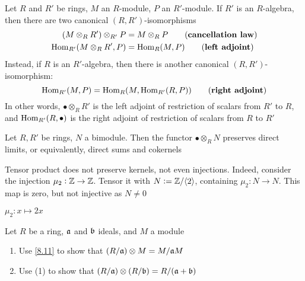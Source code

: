 \documentclass[11pt]{article}
\begin{document}
\begin{corollary}[]
Let \(R\) and \(R'\) be rings, \(M\) an \(R\)-module, \(P\) an \(R'\)-module.
If \(R'\) is an \(R\)-algebra, then there are two canonical
\((R,R')\)-isomorphisms
\begin{align*}
(M\otimes_RR')\otimes_{R'}P&=M\otimes_RP\tag*{(\textbf{cancellation law})}\\
\Hom_{R'}(M\otimes_RR',P)&=\Hom_R(M,P)\tag*{(\textbf{left adjoint})}
\end{align*}
Instead, if \(R\) is an \(R'\)-algebra, then there is another canonical
\((R,R')\)-isomorphism:
\begin{equation*}
\Hom_{R'}(M,P)=\Hom_{R}(M,\Hom_{R'}(R,P))\tag*{(\textbf{right adjoint})}
\end{equation*}
In other words, \(\bullet\otimes_RR'\) is the left adjoint of restriction of
scalars from \(R'\) to \(R\), and \(\operatorname{Hom}_{R'}(R,\bullet)\) is the right
adjoint of restriction of scalars from \(R\) to \(R'\)
\end{corollary}

\begin{corollary}[]
\label{8.11}
Let \(R,R'\) be rings, \(N\) a bimodule. Then the functor \(\bullet\otimes_R
   N\)
preserves direct limits, or equivalently, direct sums and cokernels
\end{corollary}

\begin{examplle}[]
Tensor product does not preserve kernels, not even injections. Indeed, consider
the injection \(\mu_2:\mathbb{Z}\to\mathbb{Z}\). Tensor it with \(N:=\mathbb{Z}/\langle2\rangle\), containing
\(\mu_2:N\to N\). This map is zero, but not injective as \(N\neq0\)

\(\mu_2:x\mapsto 2x\)
\end{examplle}

\begin{exercise}
\label{8.13}
Let \(R\) be a ring, \(\mathfrak{a}\) and \(\mathfrak{b}\) ideals, and \(M\) a module
\begin{enumerate}
\item Use \ref{8.11} to show that \((R/\mathfrak{a})\otimes M=M/\mathfrak{a} M\)
\item Use (1) to show that \((R/\mathfrak{a})\otimes(R/\mathfrak{b})=R/(\mathfrak{a}+\mathfrak{b})\)
\end{enumerate}
\end{exercise}
\end{document}
